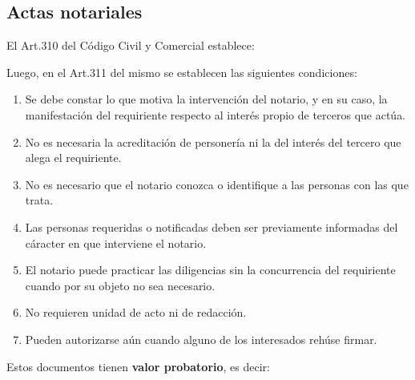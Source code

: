 \documentclass[../main.tex]{subfiles}
\begin{document}
\subsection{Actas notariales}

El Art.310 del Código Civil y Comercial establece:

\space{0.3cm}
\begin{center}
\end{center}
\vspace{0.3cm}

Luego, en el Art.311 del mismo se establecen las siguientes condiciones:

\begin{enumerate}
  \item Se debe constar lo que motiva la intervención del notario, y en su caso,
    la manifestación del requiriente respecto al interés propio de terceros
    que actúa. 
  \item No es necesaria la acreditación de personería ni la del interés del 
    tercero que alega el requiriente.
  \item No es necesario que el notario conozca o identifique a las personas con 
    las que trata.
  \item Las personas requeridas o notificadas deben ser previamente informadas 
    del cáracter en que interviene el notario.
  \item El notario puede practicar las diligencias sin la concurrencia del
    requiriente cuando por su objeto no sea necesario.
  \item No requieren unidad de acto ni de redacción.
  \item Pueden autorizarse aún cuando alguno de los interesados rehúse firmar.
\end{enumerate}

Estos documentos tienen \textbf{valor probatorio}, es decir:

\begin{center}
\end{center}
\vspace{0.3cm}
\end{document}
